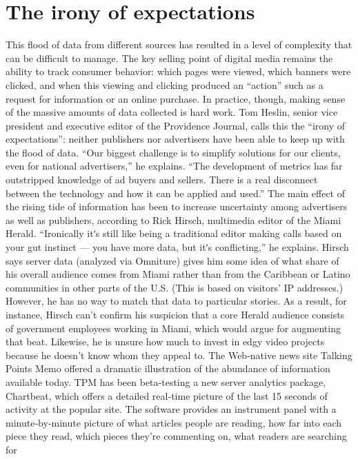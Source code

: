 \section{The irony of expectations}
This flood of data from different sources has resulted in a level of
complexity that can be difficult to manage. The key selling point of digital
media remains the ability to track consumer behavior: which pages were
viewed, which banners were clicked, and when this viewing and clicking
produced an ``action'' such as a request for information or an online
purchase. In practice, though, making sense of the massive amounts of
data collected is hard work.
Tom Heslin, senior vice president and executive editor of the Providence
Journal, calls this the ``irony of expectations'': neither publishers nor
advertisers have been able to keep up with the flood of data. ``Our biggest
challenge is to simplify solutions for our clients, even for national
advertisers,'' he explains. ``The development of metrics has far outstripped
knowledge of ad buyers and sellers. There is a real disconnect between the
technology and how it can be applied and used.''
The main effect of the rising tide of information has been to increase
uncertainty among advertisers as well as publishers, according to Rick
Hirsch, multimedia editor of the Miami Herald. ``Ironically itʹs still like
being a traditional editor making calls based on your gut instinct — you
have more data, but itʹs conflicting,'' he explains.
Hirsch says server data (analyzed via Omniture) gives him some idea of
what share of his overall audience comes from Miami rather than from the
Caribbean or Latino communities in other parts of the U.S. (This is based
on visitors’ IP addresses.) However, he has no way to match that data to
particular stories. As a result, for instance, Hirsch can’t confirm his
suspicion that a core Herald audience consists of government employees
working in Miami, which would argue for augmenting that beat.
Likewise, he is unsure how much to invest in edgy video projects because
he doesn’t know whom they appeal to.
The Web‐native news site Talking Points Memo offered a dramatic
illustration of the abundance of information available today. TPM has
been beta‐testing a new server analytics package, Chartbeat, which offers
a detailed real‐time picture of the last 15 seconds of activity at the popular
site. The software provides an instrument panel with a minute‐by‐minute
picture of what articles people are reading, how far into each piece they
read, which pieces they’re commenting on, what readers are searching for
